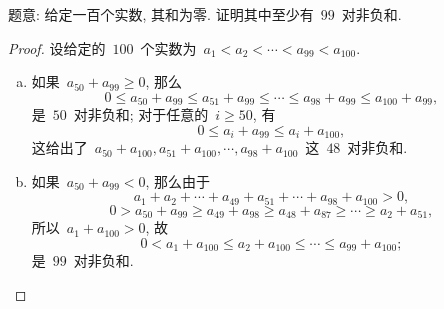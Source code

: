 \documentclass[UTF8,a4paper,10pt]{article}
\begin{document}
\begin{enumerate}
	      题意: 给定一百个实数, 其和为零. 证明其中至少有~$99$~对非负和.
	      \begin{proof}
		      设给定的~$100$~个实数为~$a_1<a_2<\cdots<a_{99}<a_{100}$.
		      \begin{enumerate}[(a)]
			      \item 如果~$a_{50}+a_{99}\geqslant 0$, 那么
			            \[
				            0\leqslant a_{50}+a_{99}\leqslant a_{51}+a_{99} \leqslant\cdots\leqslant a_{98}+a_{99}\leqslant a_{100}+a_{99},
			            \]
			            是~$50$~对非负和; 对于任意的~$i\geqslant 50$, 有
			            \[
				            0\leqslant a_i+a_{99}\leqslant a_i+a_{100},
			            \]
			            这给出了~$a_{50}+a_{100}, a_{51}+a_{100}, \cdots, a_{98}+a_{100}$~这~$48$~对非负和.
			      \item 如果~$a_{50}+a_{99}<0$, 那么由于
			            \[
				            a_1+a_2+\cdots+a_{49}+a_{51}+\cdots+a_{98}+a_{100}>0,
			            \]
			            \[
				            0>a_{50}+a_{99}\geqslant a_{49}+a_{98}\geqslant a_{48}+a_{87}\geqslant\cdots\geqslant a_{2}+a_{51},
			            \]
			            所以~$a_1+a_{100}>0$, 故
			            \[
				            0<a_1+a_{100}\leqslant a_2+a_{100}\leqslant\cdots\leqslant a_{99}+a_{100};
			            \]
			            是~$99$~对非负和.
		      \end{enumerate}
	      \end{proof}
\end{enumerate}
\end{document}
